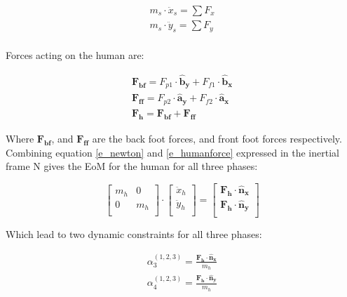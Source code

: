 \documentclass[default,iicol]{sn-jnl}
\theoremstyle{thmstyleone}%
\theoremstyle{thmstyletwo}%
\theoremstyle{thmstylethree}%
\begin{document}
\begin{equation}\label{e_newton}
\begin{array}{c}
        m_s \cdot \ddot x_s = \sum F_x  \\
        m_s \cdot \ddot y_s = \sum F_y  \\
    \end{array}
\end{equation}

\noindent Forces acting on the human are:

\begin{equation} \label{e_humanforce}
\begin{array}{cc}
      \mathbf{F_{bf}} = F_{p1} \cdot \mathbf{\hat b_y} + F_{f1} \cdot \mathbf{\hat b_x}\\
      \mathbf{F_{ff}} = F_{p2} \cdot \mathbf{\hat a_y} + F_{f2} \cdot \mathbf{\hat a_x}\\
      \mathbf{F_h}    = \mathbf{F_{bf}} + \mathbf{F_{ff}}
\end{array}
\end{equation}

\noindent Where $\mathbf{F_{bf}}$, and  $\mathbf{F_{ff}}$ are the back foot forces, and front foot forces respectively. Combining equation \ref{e_newton} and \ref{e_humanforce} expressed in the inertial frame N gives the EoM for the human for all three phases:

\begin{equation}
    \left[\begin{array}{cc}
        m_h & 0 \\
        0 & m_h \\
    \end{array}\right] \cdot \left[\begin{array}{c}
         \ddot x_h  \\
         \ddot y_h \\
    \end{array}\right]=\left[\begin{array}{c}
        \mathbf{F_h}\cdot \mathbf{\hat n_x}  \\
        \mathbf{F_h}\cdot \mathbf{\hat n_y}\\
    \end{array}\right]
\end{equation}

Which lead to two dynamic constraints for all three phases:

\begin{equation}
\begin{split}
        \alpha_{3}^{(1,2,3)} = \frac{\mathbf{F_h}\cdot \mathbf{\hat n_x}}{m_h}\\
        \alpha_{4}^{(1,2,3)} = \frac{\mathbf{F_h}\cdot \mathbf{\hat n_y}}{m_h}
\end{split}
\end{equation}
\end{document}

